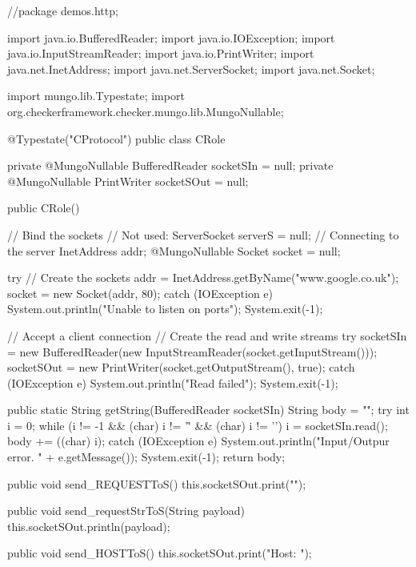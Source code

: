 \begin{code}
//package demos.http;

import java.io.BufferedReader;
import java.io.IOException;
import java.io.InputStreamReader;
import java.io.PrintWriter;
import java.net.InetAddress;
import java.net.ServerSocket;
import java.net.Socket;

import mungo.lib.Typestate;
import org.checkerframework.checker.mungo.lib.MungoNullable;

@Typestate("CProtocol")
public class CRole {
    private @MungoNullable BufferedReader socketSIn = null;
    private @MungoNullable PrintWriter socketSOut = null;

    public CRole() {
        // Bind the sockets
        // Not used: ServerSocket serverS = null;
        // Connecting to the server
        InetAddress addr;
        @MungoNullable Socket socket = null;

        try {// Create the sockets
            addr = InetAddress.getByName("www.google.co.uk");
            socket = new Socket(addr, 80);
        } catch (IOException e) {
            System.out.println("Unable to listen on ports");
            System.exit(-1);
        }

        // Accept a client connection
        // Create the read and write streams
        try {
            socketSIn = new BufferedReader(new InputStreamReader(socket.getInputStream()));
            socketSOut = new PrintWriter(socket.getOutputStream(), true);
        } catch (IOException e) {
            System.out.println("Read failed");
            System.exit(-1);
        }

    }

    public static String getString(BufferedReader socketSIn) {
        String body = "";
        try {
            int i = 0;
            while (i != -1 && (char) i != '\r' && (char) i != '\n') {
                i = socketSIn.read();
                body += ((char) i);
            }
        } catch (IOException e) {
            System.out.println("Input/Outpur error. " + e.getMessage());
            System.exit(-1);
        }
        return body;
    }

    public void send_REQUESTToS() {
        this.socketSOut.print("");
    }

    public void send_requestStrToS(String payload) {
        this.socketSOut.println(payload);
    }

    public void send_HOSTToS() {
        this.socketSOut.print("Host: ");
    }

}
\end{code}
